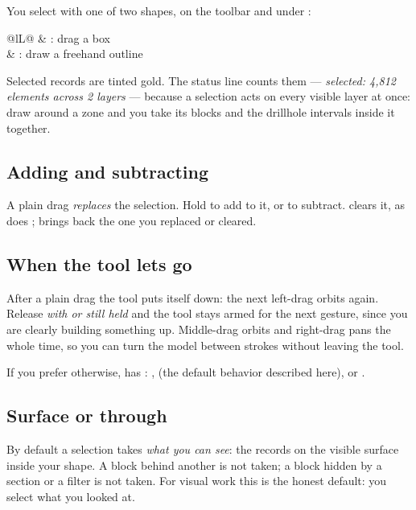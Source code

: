 You select with one of two shapes, on the toolbar and under :

\begin{center}
\begin{tabularx}{\linewidth}{@{}lL@{}}\toprule
{} & : drag a box \\
 & : draw a freehand outline \\ \bottomrule
\end{tabularx}
\end{center}

Selected records are tinted gold. The status line counts them — \emph{selected: 4,812 elements across 2 layers} — because a selection acts on every visible layer at once: draw around a zone and you take its blocks and the drillhole intervals inside it together.

\subsection{Adding and subtracting}
A plain drag \emph{replaces} the selection. Hold  to add to it, or  to subtract.  clears it, as does ;  brings back the one you replaced or cleared.

\subsection{When the tool lets go}
After a plain drag the tool puts itself down: the next left-drag orbits again. Release \emph{with  or  still held} and the tool stays armed for the next gesture, since you are clearly building something up. Middle-drag orbits and right-drag pans the whole time, so you can turn the model between strokes without leaving the tool.

If you prefer otherwise,  has : ,  (the default behavior described here), or .

\subsection{Surface or through}\label{sec:picking-through}
By default a selection takes \emph{what you can see}: the records on the visible surface inside your shape. A block behind another is not taken; a block hidden by a section or a filter is not taken. For visual work this is the honest default: you select what you looked at.

